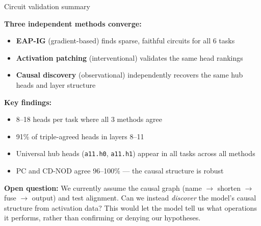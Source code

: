 \documentclass[10pt,aspectratio=169]{beamer}
\begin{document}
\begin{frame}{Circuit validation summary}

\textbf{Three independent methods converge:}
\begin{itemize}
  \item \textbf{EAP-IG} (gradient-based) finds sparse, faithful circuits for all 6 tasks
  \item \textbf{Activation patching} (interventional) validates the same head rankings
  \item \textbf{Causal discovery} (observational) independently recovers the same hub heads and layer structure
\end{itemize}

\vspace{0.5em}
\textbf{Key findings:}
\begin{itemize}
  \item 8--18 heads per task where all 3 methods agree
  \item 91\% of triple-agreed heads in layers 8--11
  \item Universal hub heads (\texttt{a11.h0}, \texttt{a11.h1}) appear in all tasks across all methods
  \item PC and CD-NOD agree 96--100\% --- the causal structure is robust
\end{itemize}

\vspace{0.5em}
{\small \textbf{Open question:} We currently assume the causal graph (name $\to$ shorten $\to$ fuse $\to$ output) and test alignment. Can we instead \emph{discover} the model's causal structure from activation data? This would let the model tell us what operations it performs, rather than confirming or denying our hypotheses.}
\end{frame}

\begin{frame}
\begin{center}
\vfill
  {\setlength{\fboxrule}{2.5pt}}
\vfill
\end{center}
\end{frame}
\end{document}
